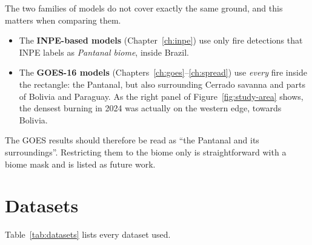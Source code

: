 \documentclass[11pt,a4paper,oneside]{report}
\begin{document}
\begin{warnbox}
The two families of models do not cover exactly the same ground, and this
matters when comparing them.
\begin{itemize}
  \item The \textbf{INPE-based models} (Chapter~\ref{ch:inpe}) use only fire
        detections that INPE labels as \emph{Pantanal biome}, inside Brazil.
  \item The \textbf{GOES-16 models} (Chapters~\ref{ch:goes}--\ref{ch:spread}) use
        \emph{every} fire inside the rectangle: the Pantanal, but also
        surrounding Cerrado savanna and parts of Bolivia and Paraguay. As the
        right panel of Figure~\ref{fig:study-area} shows, the densest burning in
        2024 was actually on the western edge, towards Bolivia.
\end{itemize}
The GOES results should therefore be read as \enquote{the Pantanal and its
surroundings}. Restricting them to the biome only is straightforward with a
biome mask and is listed as future work.
\end{warnbox}

\section{Datasets}

Table~\ref{tab:datasets} lists every dataset used.
\end{document}

